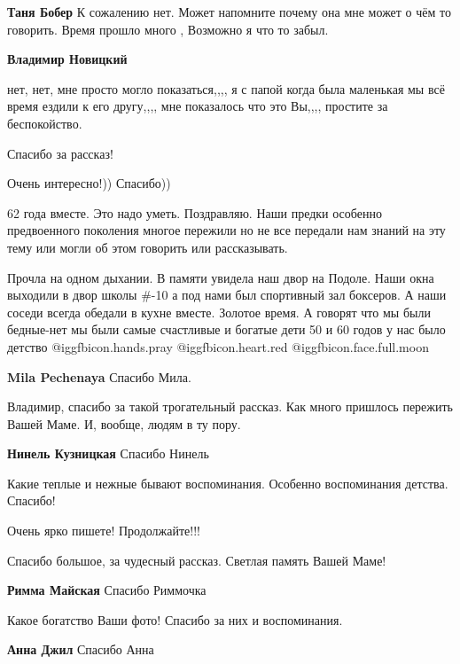 \begin{itemize}
\begin{itemize}
\textbf{Таня Бобер} К сожалению нет. Может напомните почему она мне может о чём то говорить. Время прошло много , Возможно я что то забыл.

\textbf{Владимир Новицкий} 

нет, нет, мне просто могло показаться,,,, я с папой когда была маленькая мы всё
время ездили к его другу,,,, мне показалось что это Вы,,,, простите за
беспокойство.

\end{itemize} %

Спасибо за рассказ!

Очень интересно!)) Спасибо))


62 года вместе. Это надо уметь. Поздравляю. Наши предки особенно предвоенного
поколения многое пережили но не все передали нам знаний на эту тему или могли
об этом говорить или рассказывать.


Прочла на одном дыхании. В памяти увидела наш двор на Подоле. Наши окна
выходили в двор школы \#-10 а под нами был спортивный зал боксеров. А наши
соседи всегда обедали в кухне вместе. Золотое время. А говорят что мы были
бедные-нет мы были самые счастливые и богатые дети 50 и 60 годов у нас было
детство @igg{fbicon.hands.pray} @igg{fbicon.heart.red}
@igg{fbicon.face.full.moon} 

\textbf{Mila Pechenaya} Спасибо Мила.

Владимир, спасибо за такой трогательный рассказ. Как много пришлось пережить
Вашей Маме. И, вообще, людям в ту пору.

\textbf{Нинель Кузницкая} Спасибо Нинель

Какие теплые и нежные бывают воспоминания. Особенно воспоминания детства. Спасибо!

Очень ярко пишете! Продолжайте!!!

Спасибо большое, за чудесный рассказ. Светлая память Вашей Маме!

\textbf{Римма Майская} Спасибо Риммочка

Какое богатство Ваши фото!
Спасибо за них и воспоминания.

\textbf{Анна Джил} Спасибо Анна


\end{itemize}
